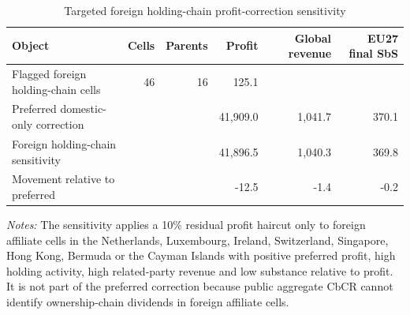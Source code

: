 \begin{table}[H]
\centering
\footnotesize
\setlength{\tabcolsep}{3pt}
\caption{Targeted foreign holding-chain profit-correction sensitivity}
\label{tab:profit_correction_foreign_holding_chain}
\begin{tabular}{@{}lrrrrr@{}}
\toprule
Object & Cells & Parents & Profit & Global revenue & EU27 final SbS \\
\midrule
Flagged foreign holding-chain cells & 46 & 16 & 125.1 &  &  \\
Preferred domestic-only correction &  &  & 41,909.0 & 1,041.7 & 370.1 \\
Foreign holding-chain sensitivity &  &  & 41,896.5 & 1,040.3 & 369.8 \\
Movement relative to preferred &  &  & -12.5 & -1.4 & -0.2 \\
\bottomrule
\end{tabular}

\vspace{0.35em}
\noindent\begin{minipage}{\textwidth}
\footnotesize\raggedright\textit{Notes:} The sensitivity applies a 10\% residual profit haircut only to foreign affiliate cells in the Netherlands, Luxembourg, Ireland, Switzerland, Singapore, Hong Kong, Bermuda or the Cayman Islands with positive preferred profit, high holding activity, high related-party revenue and low substance relative to profit. It is not part of the preferred correction because public aggregate CbCR cannot identify ownership-chain dividends in foreign affiliate cells.
\end{minipage}
\end{table}
